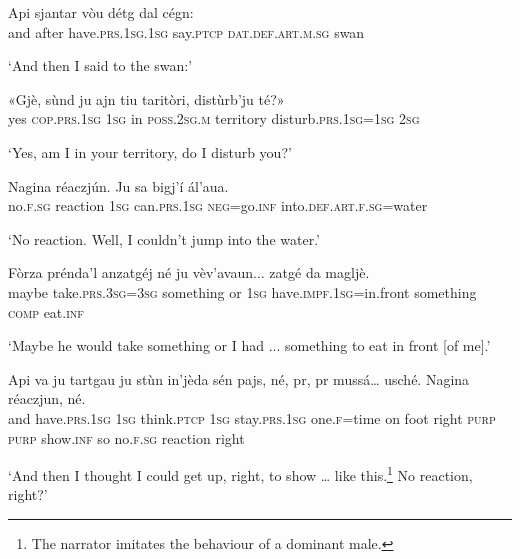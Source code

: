 \begin{linenumbers}
\gll  Api sjantar vòu détg dal cégn:  \\
and after have.\textsc{prs.1sg.1sg} say.\textsc{ptcp} \textsc{dat.def.art.m.sg} swan \\
\end{linenumbers}
\medskip
\glt `And then I said to the swan:'
\medskip

\begin{linenumbers}
\gll «Gjè, sùnd ju ajn tiu taritòri, distùrb’ju té?»   \\
yes \textsc{cop.prs.1sg} \textsc{1sg} in \textsc{poss.2sg.m} territory disturb.\textsc{prs.1sg=1sg} \textsc{2sg} \\
\end{linenumbers}
\medskip
\glt `Yes, am I in your territory, do I disturb you?'
\medskip

\begin{linenumbers}
\gll  Nagina réaczjún. Ju sa bigj’í ál’aua.  \\
no.\textsc{f.sg} reaction \textsc{1sg} can.\textsc{prs.1sg} \textsc{neg}=go.\textsc{inf}  into.\textsc{def.art.f.sg}=water \\
\end{linenumbers}
\medskip
\glt `No reaction. Well, I couldn’t jump into the water.'
\medskip

\begin{linenumbers}
\gll Fòrza prénda’l anzatgéj né ju vèv’avaun... zatgé da magljè.  \\
maybe take.\textsc{prs.3sg=3sg} something or \textsc{1sg} have.\textsc{impf.1sg=}in.front something \textsc{comp} eat.\textsc{inf}\\
\end{linenumbers}
\medskip
\glt `Maybe he would take something or I had ... something to eat in front [of me].'
\medskip

\begin{linenumbers}
\gll  Api va ju tartgau ju stùn in’jèda sén pajs, né, pr, pr mussá… usché.  Nagina réaczjun, né.\\
and have.\textsc{prs.1sg}  \textsc{1sg} think.\textsc{ptcp} \textsc{1sg}  stay.\textsc{prs.1sg} one.\textsc{f=}time on foot right \textsc{purp} \textsc{purp} show.\textsc{inf} so  no.\textsc{f.sg} reaction right\\
\end{linenumbers}\medskip
\glt `And then I thought I could get up, right, to show … like this.\footnote{The narrator imitates the behaviour of a dominant male.} No reaction, right?'\medskip

